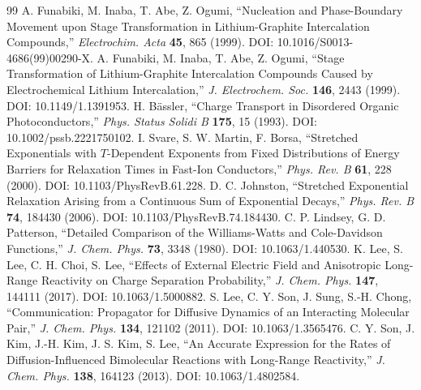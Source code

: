 \documentclass[11pt,a4paper]{article}
\begin{document}
\begin{thebibliography}{99}
 A. Funabiki, M. Inaba, T. Abe, Z. Ogumi, ``Nucleation and Phase-Boundary Movement upon Stage Transformation in Lithium-Graphite Intercalation Compounds,'' \emph{Electrochim. Acta} \textbf{45}, 865 (1999). DOI: 10.1016/S0013-4686(99)00290-X.
 A. Funabiki, M. Inaba, T. Abe, Z. Ogumi, ``Stage Transformation of Lithium-Graphite Intercalation Compounds Caused by Electrochemical Lithium Intercalation,'' \emph{J. Electrochem. Soc.} \textbf{146}, 2443 (1999). DOI: 10.1149/1.1391953.
 H. B\"assler, ``Charge Transport in Disordered Organic Photoconductors,'' \emph{Phys. Status Solidi B} \textbf{175}, 15 (1993). DOI: 10.1002/pssb.2221750102.
 I. Svare, S. W. Martin, F. Borsa, ``Stretched Exponentials with $T$-Dependent Exponents from Fixed Distributions of Energy Barriers for Relaxation Times in Fast-Ion Conductors,'' \emph{Phys. Rev. B} \textbf{61}, 228 (2000). DOI: 10.1103/PhysRevB.61.228.
 D. C. Johnston, ``Stretched Exponential Relaxation Arising from a Continuous Sum of Exponential Decays,'' \emph{Phys. Rev. B} \textbf{74}, 184430 (2006). DOI: 10.1103/PhysRevB.74.184430.
 C. P. Lindsey, G. D. Patterson, ``Detailed Comparison of the Williams-Watts and Cole-Davidson Functions,'' \emph{J. Chem. Phys.} \textbf{73}, 3348 (1980). DOI: 10.1063/1.440530.
 K. Lee, S. Lee, C. H. Choi, S. Lee, ``Effects of External Electric Field and Anisotropic Long-Range Reactivity on Charge Separation Probability,'' \emph{J. Chem. Phys.} \textbf{147}, 144111 (2017). DOI: 10.1063/1.5000882.
 S. Lee, C. Y. Son, J. Sung, S.-H. Chong, ``Communication: Propagator for Diffusive Dynamics of an Interacting Molecular Pair,'' \emph{J. Chem. Phys.} \textbf{134}, 121102 (2011). DOI: 10.1063/1.3565476.
 C. Y. Son, J. Kim, J.-H. Kim, J. S. Kim, S. Lee, ``An Accurate Expression for the Rates of Diffusion-Influenced Bimolecular Reactions with Long-Range Reactivity,'' \emph{J. Chem. Phys.} \textbf{138}, 164123 (2013). DOI: 10.1063/1.4802584.
\end{thebibliography}
\end{document}

